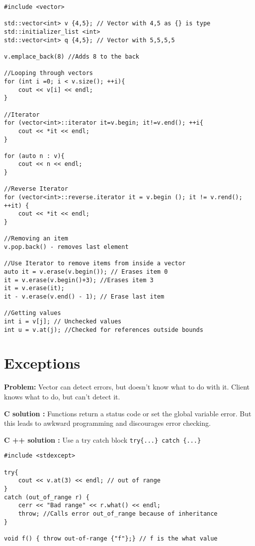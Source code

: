 \documentclass{article}
\begin{document}
\begin{lstlisting}
#include <vector>

std::vector<int> v {4,5}; // Vector with 4,5 as {} is type std::initializer_list <int>
std::vector<int> q {4,5}; // Vector with 5,5,5,5

v.emplace_back(8) //Adds 8 to the back 

//Looping through vectors 
for (int i =0; i < v.size(); ++i){
	cout << v[i] << endl;
}

//Iterator 
for (vector<int>::iterator it=v.begin; it!=v.end(); ++i{
	cout << *it << endl;
}

for (auto n : v){
	cout << n << endl;
}

//Reverse Iterator 
for (vector<int>::reverse.iterator it = v.begin (); it != v.rend(); ++it) {
	cout << *it << endl;
}

//Removing an item 
v.pop.back() - removes last element 

//Use Iterator to remove items from inside a vector 
auto it = v.erase(v.begin()); // Erases item 0
it = v.erase(v.begin()+3); //Erases item 3
it = v.erase(it); 
it - v.erase(v.end() - 1); // Erase last item 

//Getting values 
int i = v[j]; // Unchecked values 
int u = v.at(j); //Checked for references outside bounds

\end{lstlisting}

\section{Exceptions}
\textbf{Problem:} Vector can detect errors, but doesn't know what to do with it. Client knows what to do, but can't detect it.

\textbf{C solution :} Functions return a status code or set the global variable error.  But this leads to awkward programming and discourages error checking. 

\textbf{C ++ solution :} Use a try catch block \verb|try{...} catch {...}|

\begin{lstlisting}
#include <stdexcept>

try{
	cout << v.at(3) << endl; // out of range
}
catch (out_of_range r) {
	cerr << "Bad range" << r.what() << endl;
	throw; //Calls error out_of_range because of inheritance 
}

void f() { throw out-of-range {"f"};} // f is the what value
\end{lstlisting}
\end{document}
